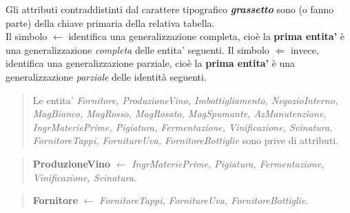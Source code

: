 Gli attributi contraddistinti dal carattere tipografico \textbf{\emph{grassetto}} sono (o fanno parte) della chiave primaria della relativa tabella. \\
Il simbolo $\gets$ identifica una generalizzazione completa, cioè la \textbf{prima entita'} è una generalizzazione \emph{completa} delle entita' seguenti.
Il simbolo $\Leftarrow$ invece, identifica una generalizzazione parziale, cioè la \textbf{prima entita'} è una generalizzazione \emph{parziale} delle identità seguenti.

\begin{verse}
	Le entita' \emph{Fornitore, ProduzioneVino, Imbottigliamento, NegozioInterno, MagBianco, MagRosso, MagRosato, MagSpumante, AzManutenzione, IngrMateriePrime, Pigiatura, Fermentazione, Vinificazione, Svinatura, FornitoreTappi, FornitureUva, FornitoreBottiglie} sono prive di attributi.
\end{verse}
\begin{verse}
	\textbf{ProduzioneVino} $\gets$ \emph{IngrMateriePrime, Pigiatura, Fermentazione, Vinificazione, Svinatura}.
\end{verse}
\begin{verse}
	\textbf{Fornitore} $\gets$ \emph{FornitoreTappi, FornitureUva, FornitoreBottiglie}.
\end{verse}


